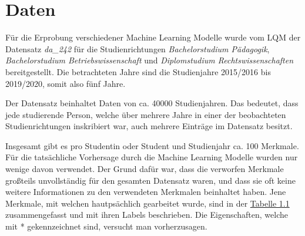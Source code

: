 

\section{Daten}
\label{sec:daten}

F\"ur die Erprobung verschiedener Machine Learning Modelle wurde vom LQM der Datensatz
\textit{da\_242} f\"ur die Studienrichtungen \textit{Bachelorstudium P\"adagogik},
\textit{Bachelorstudium Betriebswissenschaft} und \textit{Diplomstudium Rechtswissenschaften} bereitgestellt.
Die betrachteten Jahre sind die Studienjahre 2015/2016 bis 2019/2020, somit also f\"unf Jahre.

Der Datensatz beinhaltet Daten von ca. 40000 Studienjahren. Das bedeutet, dass jede studierende Person,
welche \"uber mehrere Jahre in einer der beobachteten Studienrichtungen inskribiert war, auch mehrere Eintr\"age im Datensatz besitzt.

Insgesamt gibt es pro Studentin oder Student und Studienjahr ca. 100 Merkmale.
F\"ur die tats\"achliche Vorhersage durch die Machine Learning Modelle wurden nur wenige davon verwendet.
Der Grund daf\"ur war, dass die verworfen Merkmale gro{\ss}teils unvollst\"andig f\"ur den gesamten Datensatz waren,
und dass sie oft keine weitere Informationen zu den verwendeten Merkmalen beinhaltet haben. Jene Merkmale, mit welchen hautps\"achlich
gearbeitet wurde, sind in der \hyperref[tab:name]{Tabelle 1.1} zusammengefasst und mit ihren Labels beschrieben. Die Eigenschaften, welche mit
*  gekennzeichnet sind, versucht man vorherzusagen.

